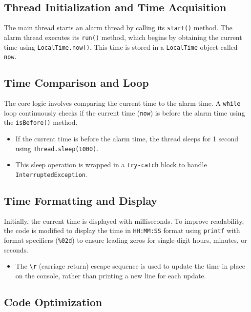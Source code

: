 \documentclass{article}
\begin{document}
\begin{itemize}
\subsection{Thread Initialization and Time Acquisition}

The main thread starts an alarm thread by calling its \texttt{start()} method. The alarm thread executes its \texttt{run()} method, which begins by obtaining the current time using \texttt{LocalTime.now()}.  This time is stored in a \texttt{LocalTime} object called \texttt{now}.

\subsection{Time Comparison and Loop}

The core logic involves comparing the current time to the alarm time.  A \texttt{while} loop continuously checks if the current time (\texttt{now}) is before the alarm time using the \texttt{isBefore()} method.

\begin{itemize}
    \item If the current time is before the alarm time, the thread sleeps for 1 second using \texttt{Thread.sleep(1000)}.
    \item This sleep operation is wrapped in a \texttt{try-catch} block to handle \texttt{InterruptedException}.
\end{itemize}

\subsection{Time Formatting and Display}

Initially, the current time is displayed with milliseconds.  To improve readability, the code is modified to display the time in \texttt{HH:MM:SS} format using \texttt{printf} with format specifiers (\texttt{\%02d}) to ensure leading zeros for single-digit hours, minutes, or seconds.

\begin{itemize}
    \item The \texttt{\textbackslash r} (carriage return) escape sequence is used to update the time in place on the console, rather than printing a new line for each update.
\end{itemize}

\subsection{Code Optimization}


\end{itemize}
\end{document}

